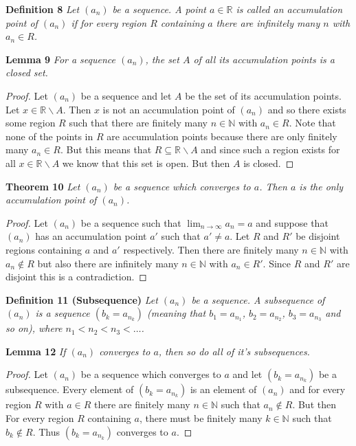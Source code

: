 \documentclass{article}
\begin{document}
\begin{flushleft}
\textbf{Definition 8}
\textsl{Let $(a_n)$ be a sequence. A point $a \in \mathbb{R}$ is called an accumulation point of $(a_n)$ if for every region $R$ containing $a$ there are infinitely many $n$ with $a_n \in R$.}\newline

\textbf{Lemma 9}
\textsl{For a sequence $(a_n)$, the set $A$ of all its accumulation points is a closed set.}
\begin{proof}
Let $(a_n)$ be a sequence and let $A$ be the set of its accumulation points. Let $x \in \mathbb{R} \backslash A$. Then $x$ is not an accumulation point of $(a_n)$ and so there exists some region $R$ such that there are finitely many $n \in \mathbb{N}$ with $a_n \in R$. Note that none of the points in $R$ are accumulation points because there are only finitely many $a_n \in R$. But this means that $R \subseteq \mathbb{R} \backslash A$ and since such a region exists for all $x \in \mathbb{R} \backslash A$ we know that this set is open. But then $A$ is closed.
\end{proof}

\textbf{Theorem 10}
\textsl{Let $(a_n)$ be a sequence which converges to $a$. Then $a$ is the only accumulation point of $(a_n)$.}
\begin{proof}
Let $(a_n)$ be a sequence such that $\lim_{n \rightarrow \infty} a_n = a$ and suppose that $(a_n)$ has an accumulation point $a'$ such that $a' \neq a$. Let $R$ and $R'$ be disjoint regions containing $a$ and $a'$ respectively. Then there are finitely many $n \in \mathbb{N}$ with $a_n \notin R$ but also there are infinitely many $n \in \mathbb{N}$ with $a_n \in R'$. Since $R$ and $R'$ are disjoint this is a contradiction.
\end{proof}

\textbf{Definition 11 (Subsequence)}
\textsl{Let $(a_n)$ be a sequence. A subsequence of $(a_n)$ is a sequence $(b_k=a_{n_k})$ (meaning that $b_1=a_{n_1}$, $b_2=a_{n_2}$, $b_3=a_{n_3}$ and so on), where $n_1<n_2<n_3< \dots$.}\newline

\textbf{Lemma 12}
\textsl{If $(a_n)$ converges to $a$, then so do all of it's subsequences.}
\begin{proof}
Let $(a_n)$ be a sequence which converges to $a$ and let $(b_k = a_{n_k})$ be a subsequence. Every element of $(b_k=a_{n_k})$ is an element of $(a_n)$ and for every region $R$ with $a \in R$ there are finitely many $n \in \mathbb{N}$ such that $a_n \notin R$. But then For every region $R$ containing $a$, there must be finitely many $k \in \mathbb{N}$ such that $b_k \notin R$. Thus $(b_k = a_{n_k})$ converges to $a$.
\end{proof}


\end{flushleft}
\end{document}
